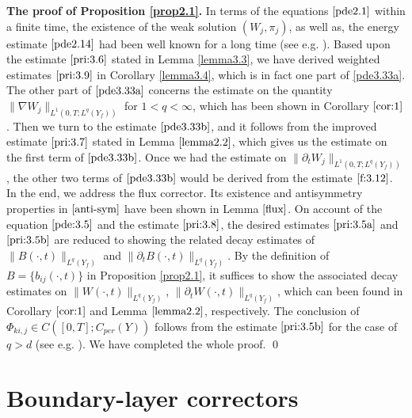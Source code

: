 \documentclass[13pt,CJK]{article}
\theoremstyle{plain}                       %
\theoremstyle{remark}
\numberwithin{equation}{section}
\begin{document}
\noindent\textbf{The proof of Proposition \ref{prop2.1}.}
In terms of the equations $\eqref{pde2.1}$ within a finite time,
the existence of the weak solution $(W_j,\pi_j)$, as well as,
the energy estimate $\eqref{pde2.14}$ had been well known
for a long time (see e.g. \cite[Chapter3]{Temam79}).
Based upon the estimate $\eqref{pri:3.6}$ stated in Lemma \ref{lemma3.3},
we have derived weighted estimates $\eqref{pri:3.9}$ in Corollary \ref{lemma3.4},
which is in fact one part of \eqref{pde3.33a}. The other part of $\eqref{pde3.33a}$
concerns the estimate on the quantity $\|\nabla W_j\|_{L^1(0,T;L^q(Y_f))}$
for $1<q<\infty$, which has been shown in Corollary $\ref{cor:1}$.
Then we turn to the estimate $\eqref{pde3.33b}$, and it follows from
the improved estimate $\eqref{pri:3.7}$ stated in Lemma $\ref{lemma2.2}$,
which gives us the estimate on the first term of $\eqref{pde3.33b}$.
Once we had the estimate on $\|\partial_t W_j\|_{L^1(0,T;L^q(Y_f))}$,
the other two terms of $\eqref{pde3.33b}$ would be derived from
the estimate $\eqref{f:3.12}$. In the end, we address the flux corrector.
Its existence and antisymmetry properties in $\eqref{anti-sym}$
have been shown in Lemma $\ref{flux}$. On account of the equation
$\eqref{pde:3.5}$ and the estimate $\eqref{pri:3.8}$,
the desired estimates $\eqref{pri:3.5a}$ and $\eqref{pri:3.5b}$
are reduced to showing the related decay estimates of $\|B(\cdot,t)\|_{L^q(Y_f)}$
and $\|\partial_t B(\cdot,t)\|_{L^q(Y_f)}$. By
the definition of $B=\{b_{ij}(\cdot,t)\}$ in Proposition \ref{prop2.1}, it suffices to show the associated
decay estimates on $\|W(\cdot,t)\|_{L^q(Y_f)}$,
$\|\partial_tW(\cdot,t)\|_{L^q(Y_f)}$, which can been found in
Corollary $\ref{cor:1}$ and
Lemma $\ref{lemma2.2}$, respectively. The conclusion
of $\Phi_{ki,j}\in C([0,T];C_{per}(Y))$ follows from the
estimate $\eqref{pri:3.5b}$ for the case of $q>d$ (see e.g.
\cite[Theorem 2 in Subsection 5.9.2]{Evans10}).
We have completed the whole proof.
\qed



\section{Boundary-layer correctors}\label{sec4}
\end{document}

